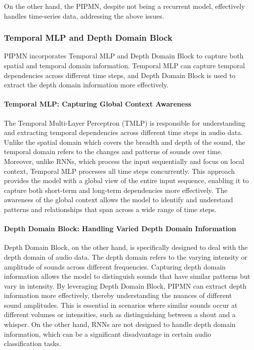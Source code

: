\documentclass[runningheads]{llncs}
\begin{document}
On the other hand, the PIPMN, despite not being a recurrent model, effectively handles time-series data, addressing the above issues.

\subsubsection{Temporal MLP and Depth Domain Block}

PIPMN incorporates Temporal MLP and Depth Domain Block to capture both spatial and temporal domain information. Temporal MLP can capture temporal dependencies across different time steps, and Depth Domain Block is used to extract the depth domain information more effectively.

\paragraph{Temporal MLP: Capturing Global Context Awareness}

The Temporal Multi-Layer Perceptron (TMLP) is responsible for understanding and extracting temporal dependencies across different time steps in audio data. Unlike the spatial domain which covers the breadth and depth of the sound, the temporal domain refers to the changes and patterns of sounds over time. Moreover, unlike RNNs, which process the input sequentially and focus on local context, Temporal MLP processes all time steps concurrently. This approach provides the model with a global view of the entire input sequence, enabling it to capture both short-term and long-term dependencies more effectively. The awareness of the global context allows the model to identify and understand patterns and relationships that span across a wide range of time steps.

\paragraph{Depth Domain Block: Handling Varied Depth Domain Information}

Depth Domain Block, on the other hand, is specifically designed to deal with the depth domain of audio data. The depth domain refers to the varying intensity or amplitude of sounds across different frequencies. Capturing depth domain information allows the model to distinguish sounds that have similar patterns but vary in intensity. By leveraging Depth Domain Block, PIPMN can extract depth information more effectively, thereby understanding the nuances of different sound amplitudes. This is essential in scenarios where similar sounds occur at different volumes or intensities, such as distinguishing between a shout and a whisper. On the other hand, RNNs are not designed to handle depth domain information, which can be a significant disadvantage in certain audio classification tasks.
\end{document}
